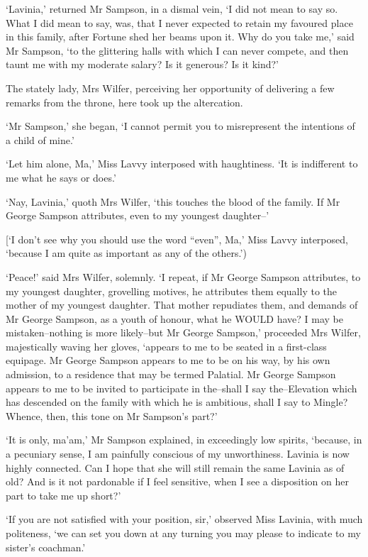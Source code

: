 ‘Lavinia,’ returned Mr Sampson, in a dismal vein, ‘I did not mean to
say so. What I did mean to say, was, that I never expected to retain my
favoured place in this family, after Fortune shed her beams upon it. Why
do you take me,’ said Mr Sampson, ‘to the glittering halls with which
I can never compete, and then taunt me with my moderate salary? Is it
generous? Is it kind?’

The stately lady, Mrs Wilfer, perceiving her opportunity of delivering a
few remarks from the throne, here took up the altercation.

‘Mr Sampson,’ she began, ‘I cannot permit you to misrepresent the
intentions of a child of mine.’

‘Let him alone, Ma,’ Miss Lavvy interposed with haughtiness. ‘It is
indifferent to me what he says or does.’

‘Nay, Lavinia,’ quoth Mrs Wilfer, ‘this touches the blood of the family.
If Mr George Sampson attributes, even to my youngest daughter--’

[‘I don’t see why you should use the word “even”, Ma,’ Miss Lavvy
interposed, ‘because I am quite as important as any of the others.’)

‘Peace!’ said Mrs Wilfer, solemnly. ‘I repeat, if Mr George Sampson
attributes, to my youngest daughter, grovelling motives, he attributes
them equally to the mother of my youngest daughter. That mother
repudiates them, and demands of Mr George Sampson, as a youth of honour,
what he WOULD have? I may be mistaken--nothing is more likely--but Mr
George Sampson,’ proceeded Mrs Wilfer, majestically waving her gloves,
‘appears to me to be seated in a first-class equipage. Mr George Sampson
appears to me to be on his way, by his own admission, to a residence
that may be termed Palatial. Mr George Sampson appears to me to be
invited to participate in the--shall I say the--Elevation which has
descended on the family with which he is ambitious, shall I say to
Mingle? Whence, then, this tone on Mr Sampson’s part?’

‘It is only, ma’am,’ Mr Sampson explained, in exceedingly low spirits,
‘because, in a pecuniary sense, I am painfully conscious of my
unworthiness. Lavinia is now highly connected. Can I hope that she will
still remain the same Lavinia as of old? And is it not pardonable if
I feel sensitive, when I see a disposition on her part to take me up
short?’

‘If you are not satisfied with your position, sir,’ observed Miss
Lavinia, with much politeness, ‘we can set you down at any turning you
may please to indicate to my sister’s coachman.’

